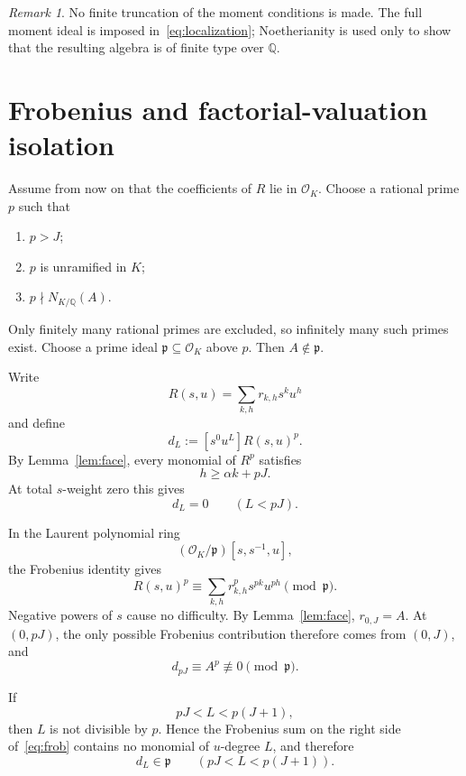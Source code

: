 \documentclass[11pt]{article}
\theoremstyle{remark}
\newtheorem{remark}[theorem]{Remark}
\newcommand{\Q}{\mathbb Q}
\begin{document}
\begin{remark}
No finite truncation of the moment conditions is made. The full moment ideal is imposed in~\eqref{eq:localization}; Noetherianity is used only to show that the resulting algebra is of finite type over $\Q$.
\end{remark}

\section{Frobenius and factorial-valuation isolation}

Assume from now on that the coefficients of $R$ lie in $\mathcal O_K$. Choose a rational prime $p$ such that
\begin{enumerate}[label=(\roman*)]
\item $p>J$;
\item $p$ is unramified in $K$;
\item $p\nmid N_{K/\Q}(A)$.
\end{enumerate}
Only finitely many rational primes are excluded, so infinitely many such primes exist. Choose a prime ideal $\mathfrak p\subseteq\mathcal O_K$ above $p$. Then $A\notin\mathfrak p$.

Write
\[
R(s,u)=\sum_{k,h}r_{k,h}s^ku^h
\]
and define
\begin{equation}\label{eq:dL}
d_L:=[s^0u^L]R(s,u)^p.
\end{equation}
By Lemma~\ref{lem:face}, every monomial of $R^p$ satisfies
\[
h\ge \alpha k+pJ.
\]
At total $s$-weight zero this gives
\begin{equation}\label{eq:below}
d_L=0
\qquad(L<pJ).
\end{equation}

In the Laurent polynomial ring
\[
(\mathcal O_K/\mathfrak p)[s,s^{-1},u],
\]
the Frobenius identity gives
\begin{equation}\label{eq:frob}
R(s,u)^p
\equiv
\sum_{k,h}r_{k,h}^{p}s^{pk}u^{ph}
\pmod{\mathfrak p}.
\end{equation}
Negative powers of $s$ cause no difficulty. By Lemma~\ref{lem:face}, $r_{0,J}=A$. At $(0,pJ)$, the only possible Frobenius contribution therefore comes from $(0,J)$, and
\begin{equation}\label{eq:targetmod}
d_{pJ}
\equiv
A^p
\not\equiv0
\pmod{\mathfrak p}.
\end{equation}

If
\[
pJ<L<p(J+1),
\]
then $L$ is not divisible by $p$. Hence the Frobenius sum on the right side of~\eqref{eq:frob} contains no monomial of $u$-degree $L$, and therefore
\begin{equation}\label{eq:intervalmod}
d_L\in\mathfrak p
\qquad(pJ<L<p(J+1)).
\end{equation}
\end{document}
